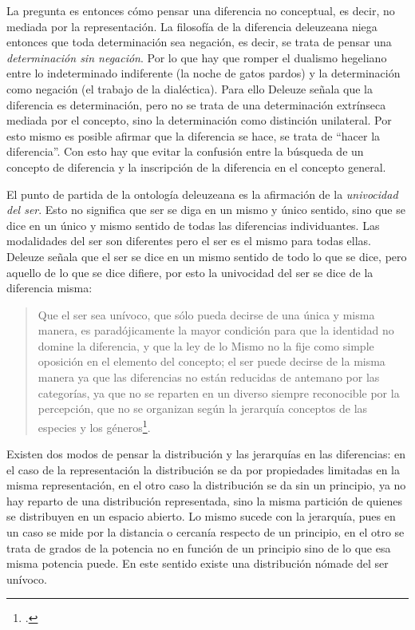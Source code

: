 La pregunta es entonces cómo pensar una diferencia no conceptual, es decir, no mediada por la representación. La filosofía de la diferencia deleuzeana niega entonces que toda determinación sea negación, es decir, se trata de pensar una \emph{determinación sin negación}. Por lo que hay que romper el dualismo hegeliano entre lo indeterminado indiferente (la noche de gatos pardos) y la determinación como negación (el trabajo de la dialéctica). Para ello Deleuze señala que la diferencia es determinación, pero no se trata de una determinación extrínseca mediada por el concepto, sino la determinación como distinción unilateral. Por esto mismo es posible afirmar que la diferencia se hace, se trata de \enquote{hacer la diferencia}. Con esto hay que evitar la confusión entre la búsqueda de un concepto de diferencia y la inscripción de la diferencia en el concepto general.

El punto de partida de la ontología deleuzeana es la afirmación de la \emph{univocidad del ser}. Esto no significa que ser se diga en un mismo y único sentido, sino que se dice en un único y mismo sentido de todas las diferencias individuantes. Las modalidades del ser son diferentes pero el ser es el mismo para todas ellas. Deleuze señala que el ser se dice en un mismo sentido de todo lo que se dice, pero aquello de lo que se dice difiere, por esto la univocidad del ser se dice de la diferencia misma:

\begin{quote}
Que el ser sea unívoco, que sólo pueda decirse de una única y misma manera, es paradójicamente la mayor condición para que la identidad no domine la diferencia, y que la ley de lo Mismo no la fije como simple oposición en el elemento del concepto; el ser puede decirse de la misma manera ya que las diferencias no están reducidas de antemano por las categorías, ya que no se reparten en un diverso siempre reconocible por la percepción, que no se organizan según la jerarquía conceptos de las especies y los géneros\footcite[42]{@6976-FOUCAULT1995}.
\end{quote}

Existen dos modos de pensar la distribución y las jerarquías en las diferencias: en el caso de la representación la distribución se da por propiedades limitadas en la misma representación, en el otro caso la distribución se da sin un principio, ya no hay reparto de una distribución representada, sino la misma partición de quienes se distribuyen en un espacio abierto. Lo mismo sucede con la jerarquía, pues en un caso se mide por la distancia o cercanía respecto de un principio, en el otro se trata de grados de la potencia no en función de un principio sino de lo que esa misma potencia puede. En este sentido existe una distribución nómade del ser unívoco.


